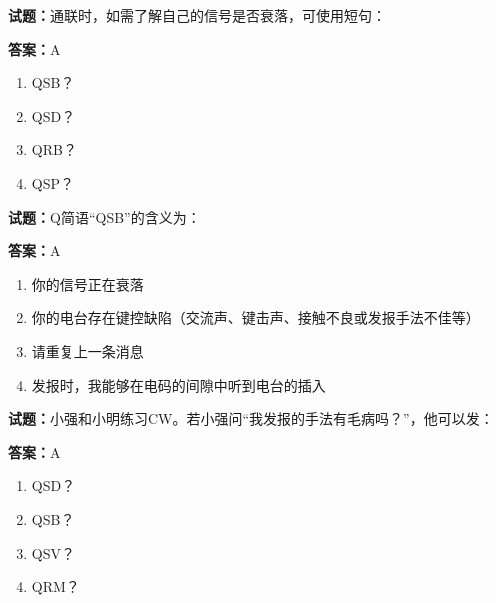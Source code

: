 \documentclass{ctexbook}
\begin{document}




\vspace{1em}

\textbf{试题：}通联时，如需了解自己的信号是否衰落，可使用短句： 

\textbf{答案：}A 

\begin{enumerate}[leftmargin=3em]
  \item QSB？ 

  \item QSD？ 

  \item QRB？ 

  \item QSP？ 

\end{enumerate}





\vspace{1em}

\textbf{试题：}Q简语“QSB”的含义为： 

\textbf{答案：}A 

\begin{enumerate}[leftmargin=3em]
  \item 你的信号正在衰落 

  \item 你的电台存在键控缺陷（交流声、键击声、接触不良或发报手法不佳等） 

  \item 请重复上一条消息 

  \item 发报时，我能够在电码的间隙中听到电台的插入 

\end{enumerate}





\vspace{1em}

\textbf{试题：}小强和小明练习CW。若小强问“我发报的手法有毛病吗？”，他可以发： 

\textbf{答案：}A 

\begin{enumerate}[leftmargin=3em]
  \item QSD？ 

  \item QSB？ 

  \item QSV？ 


  \item QRM？ 

\end{enumerate}
\end{document}
